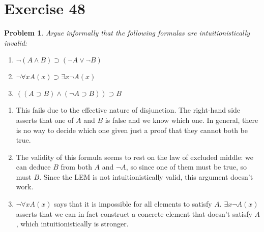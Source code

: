 \documentclass[a4paper,10pt]{article}
\newcommand{\imp}{\supset}
\newtheorem*{problem*}{Problem}
\theoremstyle{definition}
\begin{document}
 \section*{Exercise 48}
 \begin{problem*}
  Argue informally that the following formulas are intuitionistically invalid:
  \begin{enumerate}
  \item $¬(A∧B) \imp (¬A ∨ ¬B)$
   \item $¬\forall x A(x) \imp \exists x ¬A(x)$
   \item $((A \imp B) ∧ (¬A \imp B)) \imp B$
  \end{enumerate}
 \end{problem*}
\begin{enumerate}
\item This fails due to the effective nature of disjunction. The right-hand side asserts that one of $A$ and $B$ is false and we know which one. In general, there is no way to decide which one given just a proof that they cannot both be true.
  \item The validity of this formula seems to rest on the law of excluded middle: we can deduce $B$ from both $A$ and $¬A$, so since one of them must be true, so must $B$. Since the LEM is not intuitionistically valid, this argument doesn't work.
 \item $¬\forall x A(x)$ says that it is impossible for all elements to satisfy $A$. $\exists x ¬A(x)$ asserts that we can in fact construct a concrete element that doesn't satisfy $A$, which intuitionistically is stronger.
\end{enumerate}
\end{document}
